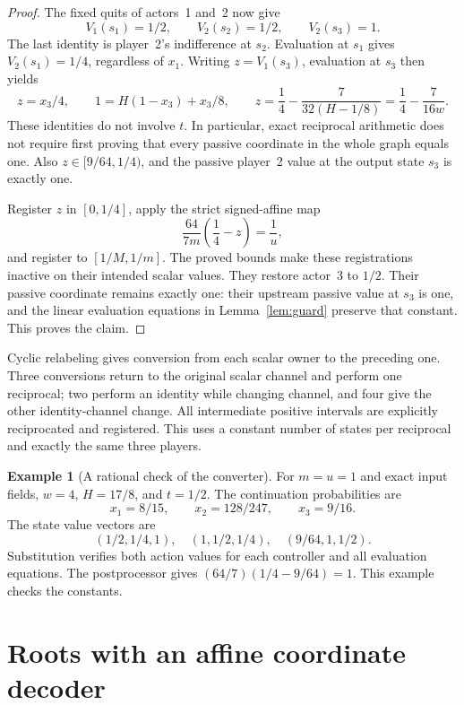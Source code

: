 \documentclass[11pt,a4paper]{article}
\numberwithin{equation}{section}
\theoremstyle{definition}
\newtheorem{example}[theorem]{Example}
\begin{document}
\begin{proof}
The fixed quits of actors~1 and~2 now give
\[
 V_1(s_1)=1/2,\qquad V_2(s_2)=1/2,\qquad V_2(s_3)=1.
\]
The last identity is player~2's indifference at \(s_2\).
Evaluation at \(s_1\) gives \(V_2(s_1)=1/4\), regardless of \(x_1\).
Writing \(z=V_1(s_3)\), evaluation at \(s_3\) then yields
\begin{equation}\label{eq:recipidentity}
 z=x_3/4,\qquad 1=H(1-x_3)+x_3/8,\qquad
 z=\frac14-\frac7{32(H-1/8)}=\frac14-\frac7{16w}.
\end{equation}
These identities do not involve \(t\). In particular, exact reciprocal
arithmetic does not require first proving that every passive coordinate
in the whole graph equals one. Also \(z\in[9/64,1/4)\), and the
passive player~2 value at the output state \(s_3\) is exactly one.

Register \(z\) in \([0,1/4]\), apply the strict signed-affine map
\begin{equation}\label{eq:recippost}
 \frac{64}{7m}\left(\frac14-z\right)=\frac1u,
\end{equation}
and register to \([1/M,1/m]\). The proved bounds make these registrations
inactive on their intended scalar values. They restore actor~3 to
\(1/2\). Their passive coordinate remains exactly one: their upstream
passive value at \(s_3\) is one, and the linear evaluation equations
in Lemma~\ref{lem:guard} preserve that constant. This proves the claim.
\end{proof}

Cyclic relabeling gives conversion from each scalar owner to the
preceding one. Three conversions return to the original scalar channel
and perform one reciprocal; two perform an identity while changing
channel, and four give the other identity-channel change. All intermediate
positive intervals are explicitly reciprocated and registered. This
uses a constant number of states per reciprocal and exactly the same
three players.

\begin{example}[A rational check of the converter]
For \(m=u=1\) and exact input fields, \(w=4\), \(H=17/8\), and
\(t=1/2\). The continuation probabilities are
\[
 x_1=8/15,\qquad x_2=128/247,\qquad x_3=9/16.
\]
The state value vectors are
\[
 (1/2,1/4,1),\quad(1,1/2,1/4),\quad(9/64,1,1/2).
\]
Substitution verifies both action values for each controller and all
evaluation equations. The postprocessor gives
\((64/7)(1/4-9/64)=1\). This example checks the constants.
\end{example}

\section{Roots with an affine coordinate decoder}\label{sec:roots}
\end{document}
